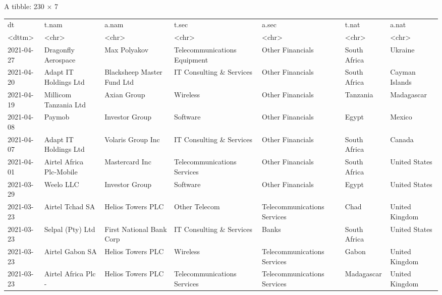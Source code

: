 \documentclass[11pt]{article}
\begin{document}
    A tibble: 230 × 7
\begin{tabular}{lllllll}
 dt & t.nam & a.nam & t.sec & a.sec & t.nat & a.nat\\
 <dttm> & <chr> & <chr> & <chr> & <chr> & <chr> & <chr>\\
\hline
	 2021-04-27 & Dragonfly Aerospace         & Max Polyakov                  & Telecommunications Equipment & Other Financials                  & South Africa & Ukraine       \\
	 2021-04-20 & Adapt IT Holdings Ltd       & Blacksheep Master Fund Ltd    & IT Consulting \& Services     & Other Financials                  & South Africa & Cayman Islands\\
	 2021-04-19 & Millicom Tanzania Ltd       & Axian Group                   & Wireless                     & Other Financials                  & Tanzania     & Madagascar    \\
	 2021-04-08 & Paymob                      & Investor Group                & Software                     & Other Financials                  & Egypt        & Mexico        \\
	 2021-04-07 & Adapt IT Holdings Ltd       & Volaris Group Inc             & IT Consulting \& Services     & Other Financials                  & South Africa & Canada        \\
	 2021-04-01 & Airtel Africa Plc-Mobile    & Mastercard Inc                & Telecommunications Services  & Other Financials                  & South Africa & United States \\
	 2021-03-29 & Weelo LLC                   & Investor Group                & Software                     & Other Financials                  & Egypt        & United States \\
	 2021-03-23 & Airtel Tchad SA             & Helios Towers PLC             & Other Telecom                & Telecommunications Services       & Chad         & United Kingdom\\
	 2021-03-23 & Selpal (Pty) Ltd            & First National Bank Corp      & IT Consulting \& Services     & Banks                             & South Africa & United States \\
	 2021-03-23 & Airtel Gabon SA             & Helios Towers PLC             & Wireless                     & Telecommunications Services       & Gabon        & United Kingdom\\
	 2021-03-23 & Airtel Africa Plc -         & Helios Towers PLC             & Telecommunications Services  & Telecommunications Services       & Madagascar   & United Kingdom\\

\end{tabular}
\end{document}
